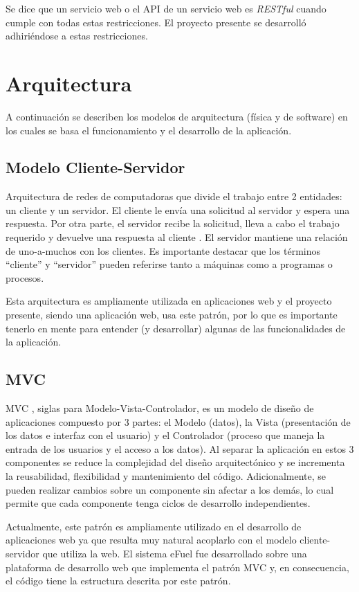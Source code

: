     Se dice que un servicio web o el API de un servicio web es \textit{RESTful} cuando cumple con todas estas restricciones. El proyecto presente se desarrolló adhiriéndose a estas restricciones.

\section{Arquitectura}
A continuación se describen los modelos de arquitectura (física y de software) en los cuales se basa el funcionamiento y el desarrollo de la aplicación.

    \subsection{Modelo Cliente-Servidor} \label{clientServer}
    Arquitectura de redes de computadoras que divide el trabajo entre 2 entidades: un cliente y un servidor. El cliente le envía una solicitud al servidor y espera una respuesta. Por otra parte, el servidor recibe la solicitud, lleva a cabo el trabajo requerido y devuelve una respuesta al cliente \cite{redesTanenbaum}. El servidor mantiene una relación de uno-a-muchos con los clientes. Es importante destacar que los términos “cliente” y “servidor” pueden referirse tanto a máquinas como a programas o procesos.

    Esta arquitectura es ampliamente utilizada en aplicaciones web y el proyecto presente, siendo una aplicación web, usa este patrón, por lo que es importante tenerlo en mente para entender (y desarrollar) algunas de las funcionalidades de la aplicación.

    \subsection{MVC} \label{mvc}
    MVC \cite{mvcKrasner}, siglas para Modelo-Vista-Controlador, es un modelo de diseño de aplicaciones compuesto por 3 partes: el Modelo (datos), la Vista (presentación de los datos e interfaz con el usuario) y el Controlador (proceso que maneja la entrada de los usuarios y el acceso a los datos). Al separar la aplicación en estos 3 componentes se reduce la complejidad del diseño arquitectónico y se incrementa la reusabilidad, flexibilidad y mantenimiento del código. Adicionalmente, se pueden realizar cambios sobre un componente sin afectar a los demás, lo cual permite que cada componente tenga ciclos de desarrollo independientes.

    Actualmente, este patrón es ampliamente utilizado en el desarrollo de aplicaciones web ya que resulta muy natural acoplarlo con el modelo cliente-servidor que utiliza la web. El sistema eFuel fue desarrollado sobre una plataforma de desarrollo web que implementa el patrón MVC y, en consecuencia, el código tiene la estructura descrita por este patrón.